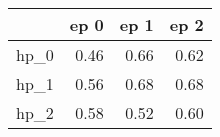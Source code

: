 \begin{tabular}{lrrr}
\toprule
{} &  ep 0 &  ep 1 &  ep 2 \\
\midrule
hp\_0 &  0.46 &  0.66 &  0.62 \\
hp\_1 &  0.56 &  0.68 &  0.68 \\
hp\_2 &  0.58 &  0.52 &  0.60 \\
\bottomrule
\end{tabular}
